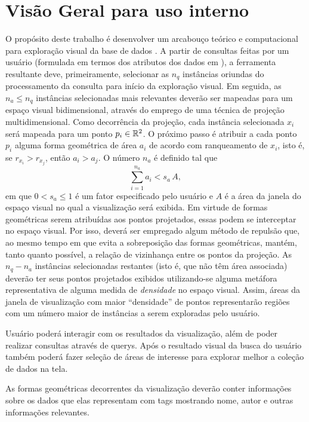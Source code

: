   
 


\section{Visão Geral para uso interno}
\label{usointerno}

O propósito deste trabalho é desenvolver um arcabouço teórico e
computacional para exploração visual da base de dados \DB.  A partir
de consultas feitas por um usuário (formulada em termos dos atributos dos
dados em \DB), a ferramenta resultante deve, primeiramente, selecionar
as $n_q$ instâncias oriundas do processamento da consulta para início
da exploração visual.  Em seguida, as $n_a\le n_q$ instâncias
selecionadas mais relevantes deverão ser mapeadas para um espaço
visual bidimensional, através do emprego de uma técnica de projeção
multidimensional.  Como decorrência da projeção, cada instância
selecionada $x_i$ será mapeada para um ponto $p_i\in\mathbb{R}^{2}$. O próximo
passo é atribuir a cada ponto $p_i$ alguma forma geométrica de área
$a_i$ de acordo com ranqueamento de $x_i$, isto é, se
$r_{x_i}>r_{x_j}$, então $a_i>a_j$. O número $n_a$ é definido tal que
$$
\sum_{i=1}^{n_a} a_i < s_a\,A,
$$
%
em que $0<s_a\le 1$ é um fator especificado pelo usuário e $A$ é a
área da janela do espaço visual no qual a visualização será exibida.
Em virtude de formas geométricas serem atribuídas aos pontos
projetados, essas podem se interceptar no espaço visual.  Por isso,
deverá ser empregado algum método de repulsão que, ao mesmo tempo em
que evita a sobreposição das formas geométricas, mantém, tanto quanto
possível, a relação de vizinhança entre os pontos da projeção.  As
$n_q-n_a$ instâncias selecionadas restantes (isto é, que não têm área
associada) deverão ter seus pontos projetados exibidos utilizando-se
alguma metáfora representativa de alguma medida de \emph{densidade} no
espaço visual. Assim, áreas da janela de visualização com maior
``densidade'' de pontos representarão regiões com um número maior de
instâncias a serem exploradas pelo usuário. 


Usuário poderá interagir com os resultados da visualização, além de poder realizar consultas através de querys. Após o resultado visual da busca do usuário também poderá fazer seleção de áreas de interesse para explorar melhor a coleção de dados na tela.

As formas geométricas decorrentes da visualização deverão conter informações sobre os dados que elas representam com tags mostrando nome, autor e outras informações relevantes.

